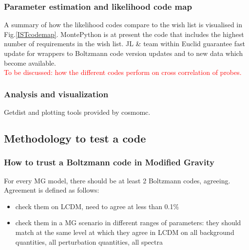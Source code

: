 \subsubsection{Parameter estimation and likelihood code map}
A summary of how the likelihood codes compare to the wish list is visualised in Fig.\ref{ISTcodemap}. MontePython is at present the code that includes the highest number of requirements in the wish list. JL \& team within Euclid guarantee fast 
update for wrappers to Boltzmann code version updates and to new data which become available. \\
\textcolor{red}{To be discussed: how the different codes perform on cross correlation of probes.}

\subsubsection{Analysis and visualization}
Getdist and plotting tools provided by cosmomc.

\subsection{Methodology to test a code}

\subsubsection{How to trust a Boltzmann code in Modified Gravity}

For every MG model, there should be at least 2 Boltzmann codes, agreeing. Agreement is defined as follows: 
\begin{itemize}
 \item check them on LCDM, need to agree at less than 0.1\%
 \item check them in a MG scenario in different ranges of parameters: they should match at the same level at which they agree in LCDM on 
all background quantities, all perturbation quantities, all spectra
\end{itemize}

